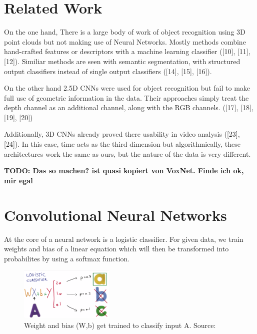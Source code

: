 \documentclass[10pt,twocolumn,letterpaper]{article}
\begin{document}

\section{Related Work}

On the one hand, There is a large body of work of object recognition using 3D point clouds but not making use of Neural Networks. 
Mostly methods combine hand-crafted features or descriptors with a machine learning classifier ([10], [11], [12]). 
Similiar methods are seen with semantic segmentation, with structured output classifiers instead of single output classifiers ([14], [15], [16]).

On the other hand 2.5D CNNs were used for object recognition but fail to make full use of geometric information in the data. Their approaches simply treat the depth channel as an additional channel, along with the RGB channels. ([17], [18], [19], [20]) 

Additionally, 3D CNNs already proved there usability in video analysis ([23], [24]). In this case, time acts as the third dimension but algorithmically, these architectures work the same as ours, but the nature of the data is very different.

\textbf{TODO: Das so machen? ist quasi kopiert von VoxNet. Finde ich ok, mir egal}

\section{Convolutional Neural Networks}

At the core of a neural network is a logistic classifier. 
For given data, we train weights and bias of a linear equation which will then be transformed into 
probabilites by using a softmax function. 

\begin{figure}[h]
	\label{fig:classifier}
	\centering
	\includegraphics[width=0.4\textwidth]{classifier}
	\caption{Weight and bias (W,b) get trained to classify input A. Source: \cite{udacity}}
\end{figure}
\end{document}
